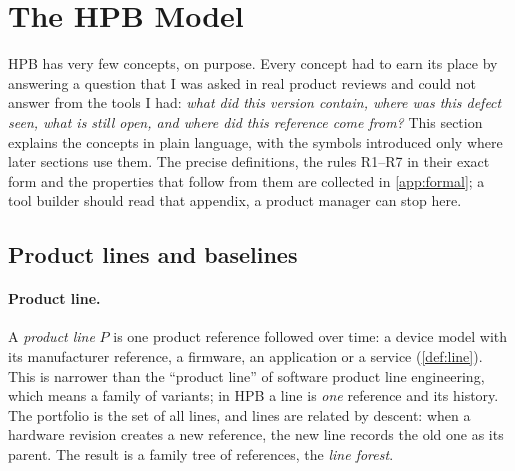 \section{The HPB Model}
\label{sec:model}

HPB has very few concepts, on purpose. Every concept had to earn its place
by answering a question that I was asked in real product reviews and could
not answer from the tools I had: \emph{what did this version contain,
where was this defect seen, what is still open, and where did this
reference come from?} This section explains the concepts in plain
language, with the symbols introduced only where later sections use them.
The precise definitions, the rules R1--R7 in their exact form and the
properties that follow from them are collected in \cref{app:formal}; a
tool builder should read that appendix, a product manager can stop here.

\subsection{Product lines and baselines}
\label{sec:model-lines}

\paragraph{Product line.}
A \emph{product line} $P$ is one product reference followed over time: a
device model with its manufacturer reference, a firmware, an application
or a service (\cref{def:line}). This is narrower than the ``product line''
of software product line engineering, which means a family of variants; in
HPB a line is \emph{one} reference and its history. The portfolio is the
set of all lines, and lines are related by descent: when a hardware
revision creates a new reference, the new line records the old one as its
parent. The result is a family tree of references, the \emph{line
forest}.

